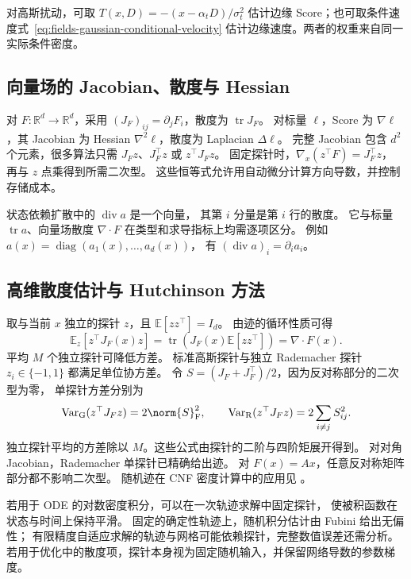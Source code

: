 对高斯扰动，可取 \(T(x,D)=-(x-\alpha_tD)/\sigma_t^2\)
估计边缘 Score；也可取条件速度式~\eqref{eq:fields-gaussian-conditional-velocity}
估计边缘速度。两者的权重来自同一实际条件密度。

\subsection{向量场的 Jacobian、散度与 Hessian}

对 \(F:\mathbb R^d\to\mathbb R^d\)，采用
\((J_F)_{ij}=\partial_jF_i\)，散度为 \(\operatorname{tr}J_F\)。
对标量 \(\ell\)，Score 为 \(\nabla\ell\)，其 Jacobian 为 Hessian
\(\nabla^2\ell\)，散度为 Laplacian \(\Delta\ell\)。
完整 Jacobian 包含 \(d^2\) 个元素，很多算法只需
\(J_Fz\)、\(J_F^\top z\) 或 \(z^\top J_Fz\)。
固定探针时，\(\nabla_x(z^\top F)=J_F^\top z\)，
再与 \(z\) 点乘得到所需二次型。
这些恒等式允许用自动微分计算方向导数，并控制存储成本。

状态依赖扩散中的 \(\operatorname{div}a\) 是一个向量，
其第 \(i\) 分量是第 \(i\) 行的散度。
它与标量 \(\operatorname{tr}a\)、向量场散度 \(\nabla\cdot F\)
在类型和求导指标上均需逐项区分。
例如 \(a(x)=\operatorname{diag}(a_1(x),\ldots,a_d(x))\)，
有 \((\operatorname{div}a)_i=\partial_i a_i\)。

\subsection{高维散度估计与 Hutchinson 方法}

取与当前 \(x\) 独立的探针 \(z\)，且 \(\mathbb E[zz^\top]=I_d\)。
由迹的循环性质可得
\begin{equation}
 \mathbb E_z[z^\top J_F(x)z]
 =\operatorname{tr}(J_F(x)\mathbb E[zz^\top])
 =\nabla\cdot F(x).
 \label{eq:fields-hutchinson}
\end{equation}
平均 \(M\) 个独立探针可降低方差。
标准高斯探针与独立 Rademacher 探针 \(z_i\in\{-1,1\}\) 都满足单位协方差。
令 \(S=(J_F+J_F^\top)/2\)，因为反对称部分的二次型为零，
单探针方差分别为
\[
 \operatorname{Var}_{\mathrm G}(z^\top J_Fz)=2\norm{S}_{\mathrm F}^2,
 \qquad
 \operatorname{Var}_{\mathrm R}(z^\top J_Fz)=2\sum_{i\ne j}S_{ij}^2.
\]
独立探针平均的方差除以 \(M\)。这些公式由探针的二阶与四阶矩展开得到。
对对角 Jacobian，Rademacher 单探针已精确给出迹。
对 \(F(x)=Ax\)，任意反对称矩阵部分都不影响二次型。
随机迹在 CNF 密度计算中的应用见 \cite{grathwohl2019ffjord}。

若用于 ODE 的对数密度积分，可以在一次轨迹求解中固定探针，
使被积函数在状态与时间上保持平滑。
固定的确定性轨迹上，随机积分估计由 Fubini 给出无偏性；
有限精度自适应求解的轨迹与网格可能依赖探针，完整数值误差还需分析。
若用于优化中的散度项，探针本身视为固定随机输入，并保留网络导数的参数梯度。

